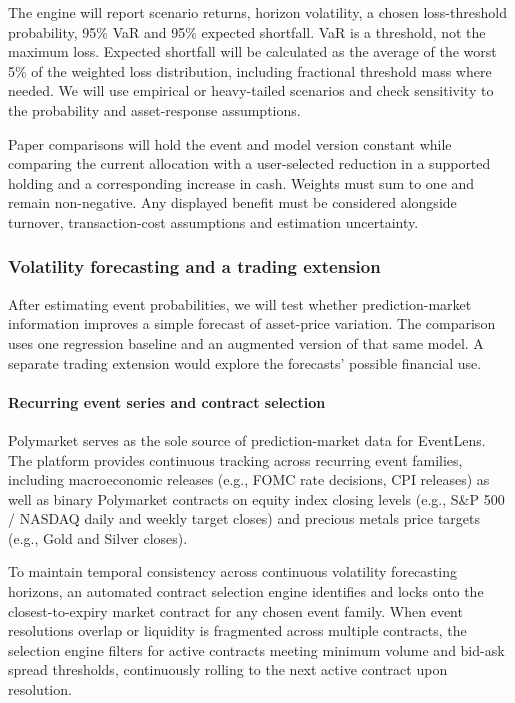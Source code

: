The engine will report scenario returns, horizon volatility, a chosen loss-threshold probability, 95\% VaR and 95\% expected shortfall. VaR is a threshold, not the maximum loss. Expected shortfall will be calculated as the average of the worst 5\% of the weighted loss distribution, including fractional threshold mass where needed. We will use empirical or heavy-tailed scenarios and check sensitivity to the probability and asset-response assumptions.

Paper comparisons will hold the event and model version constant while comparing the current allocation with a user-selected reduction in a supported holding and a corresponding increase in cash. Weights must sum to one and remain non-negative. Any displayed benefit must be considered alongside turnover, transaction-cost assumptions and estimation uncertainty.

\subsubsection{Volatility forecasting and a trading extension}

After estimating event probabilities, we will test whether prediction-market information improves a simple forecast of asset-price variation. The comparison uses one regression baseline and an augmented version of that same model. A separate trading extension would explore the forecasts' possible financial use.

\paragraph{Recurring event series and contract selection}
Polymarket serves as the sole source of prediction-market data for EventLens. The platform provides continuous tracking across recurring event families, including macroeconomic releases (e.g., FOMC rate decisions, CPI releases) as well as binary Polymarket contracts on equity index closing levels (e.g., S\&P 500 / NASDAQ daily and weekly target closes) and precious metals price targets (e.g., Gold and Silver closes).

To maintain temporal consistency across continuous volatility forecasting horizons, an automated contract selection engine identifies and locks onto the closest-to-expiry market contract for any chosen event family. When event resolutions overlap or liquidity is fragmented across multiple contracts, the selection engine filters for active contracts meeting minimum volume and bid-ask spread thresholds, continuously rolling to the next active contract upon resolution.

